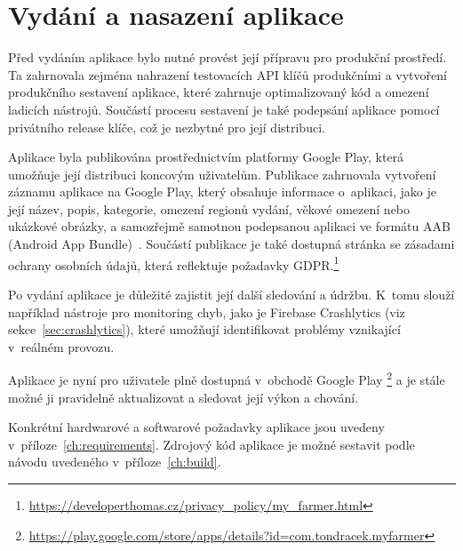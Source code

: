 \chapter{Vydání a nasazení aplikace}
Před vydáním aplikace bylo nutné provést její přípravu pro produkční prostředí.
Ta zahrnovala zejména nahrazení testovacích API klíčů produkčními a vytvoření produkčního sestavení aplikace, které zahrnuje optimalizovaný kód a omezení ladicích nástrojů.
Součástí procesu sestavení je také podepsání aplikace pomocí privátního release klíče, což je nezbytné pro její distribuci.

Aplikace byla publikována prostřednictvím platformy Google Play, která umožňuje její distribuci koncovým uživatelům.
Publikace zahrnovala vytvoření záznamu aplikace na Google Play, který obsahuje informace o~aplikaci, jako je její název, popis, kategorie, omezení regionů vydání, věkové omezení nebo ukázkové obrázky, a samozřejmě samotnou podepsanou aplikaci ve formátu AAB (Android App Bundle)~\parencite{android_app_bundle}.
Součástí publikace je také dostupná stránka se zásadami ochrany osobních údajů, která reflektuje požadavky GDPR.\footnote{\url{https://developerthomas.cz/privacy_policy/my_farmer.html}}

Po vydání aplikace je důležité zajistit její další sledování a údržbu.
K~tomu slouží například nástroje pro monitoring chyb, jako je Firebase Crashlytics (viz sekce~\ref{sec:crashlytics}), které umožňují identifikovat problémy vznikající v~reálném provozu.

Aplikace je nyní pro uživatele plně dostupná v~obchodě Google Play \footnote{\url{https://play.google.com/store/apps/details?id=com.tondracek.myfarmer}} a je stále možné ji pravidelně aktualizovat a sledovat její výkon a chování.

Konkrétní hardwarové a softwarové požadavky aplikace jsou uvedeny v~příloze~\ref{ch:requirements}.
Zdrojový kód aplikace je možné sestavit podle návodu uvedeného v~příloze~\ref{ch:build}.